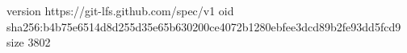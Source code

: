 version https://git-lfs.github.com/spec/v1
oid sha256:b4b75e6514d8d255d35e65b630200ce4072b1280ebfee3dcd89b2fe93dd5fcd9
size 3802
